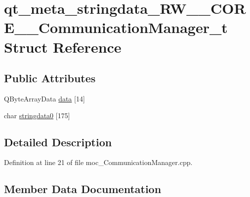 \hypertarget{structqt__meta__stringdata___r_w_____c_o_r_e_____communication_manager__t}{}\section{qt\+\_\+meta\+\_\+stringdata\+\_\+\+R\+W\+\_\+\+\_\+\+C\+O\+R\+E\+\_\+\+\_\+\+Communication\+Manager\+\_\+t Struct Reference}
\label{structqt__meta__stringdata___r_w_____c_o_r_e_____communication_manager__t}
\subsection*{Public Attributes}
\begin{DoxyCompactItemize}
\item 
Q\+Byte\+Array\+Data \hyperlink{structqt__meta__stringdata___r_w_____c_o_r_e_____communication_manager__t_a4c365a4c4238281a482a4c3f64e28a32}{data} \mbox{[}14\mbox{]}
\item 
char \hyperlink{structqt__meta__stringdata___r_w_____c_o_r_e_____communication_manager__t_a40ff55b6d2465185cd2cf354e48c98d2}{stringdata0} \mbox{[}175\mbox{]}
\end{DoxyCompactItemize}


\subsection{Detailed Description}


Definition at line 21 of file moc\+\_\+\+Communication\+Manager.\+cpp.



\subsection{Member Data Documentation}
\hypertarget{structqt__meta__stringdata___r_w_____c_o_r_e_____communication_manager__t_a4c365a4c4238281a482a4c3f64e28a32}{}\label{structqt__meta__stringdata___r_w_____c_o_r_e_____communication_manager__t_a4c365a4c4238281a482a4c3f64e28a32} 
